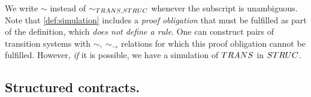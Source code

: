
We write $\sim$ instead of $\sim_{\TRANS,\STRUC}$ whenever the subscript is
unambiguous. Note that \ref{def:simulation} includes a \emph{proof obligation} that must be
fulfilled as part of the definition, which \emph{does not define a rule}.
One can construct pairs of transition
systems with $\sim,~\sim_{\to}$ relations for which this proof obligation cannot
be fulfilled. However, \emph{if} it is possible, we have a simulation of $\TRANS$
in $\STRUC$.



\subsection{Structured contracts.}
\label{sec:struc-def}

